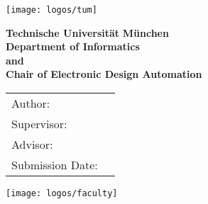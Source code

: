 \begin{titlepage}
  \centering

  \vspace{40mm}
  \texttt{[image: logos/tum]}

    \vspace*{0.8cm}
    {\huge \bf Technische Universit\"at }%
    {\huge \bf M\"unchen}\\

\bigskip \bigskip \bigskip
   {\Large \bf Department of Informatics}\\

\bigskip %
    {\Large \bf and}\\
  
\bigskip %
    {\Large \bf Chair of Electronic Design Automation}\\

  \vspace{20mm}
  {\huge\bfseries \getTitle{}}


  

  \vspace{15mm}
  \begin{tabular}{l l}
    Author: & \getAuthor{} \\
    Supervisor: & \getSupervisor{} \\
    Advisor: & \getAdvisor{} \\
    Submission Date: & \getSubmissionDate{} \\
  \end{tabular}

  \vspace{20mm}
  \texttt{[image: logos/faculty]}
\end{titlepage}
